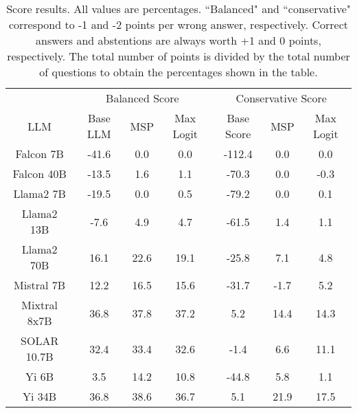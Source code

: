 \renewcommand\arraystretch{1.2}
\begin{table*}
\centering
\begin{tabular}{c|c|c|c|c|c|c}
& \multicolumn{3}{c|}{Balanced Score} & \multicolumn{3}{c}{Conservative Score} \\ 
LLM & Base LLM & MSP & Max Logit & Base Score & MSP & Max Logit\\ \hline
Falcon 7B & -41.6 & 0.0 & 0.0 & -112.4 & 0.0 & 0.0\\
Falcon 40B & -13.5 & 1.6 & 1.1 & -70.3 & 0.0 & -0.3\\
Llama2 7B & -19.5 & 0.0 & 0.5 & -79.2 & 0.0 & 0.1\\
Llama2 13B & -7.6 & 4.9 & 4.7 & -61.5 & 1.4 & 1.1\\
Llama2 70B & 16.1 & 22.6 & 19.1 & -25.8 & 7.1 & 4.8\\
Mistral 7B & 12.2 & 16.5 & 15.6 & -31.7 & -1.7 & 5.2\\
Mixtral 8x7B & 36.8 & 37.8 & 37.2 & 5.2 & 14.4 & 14.3\\
SOLAR 10.7B & 32.4 & 33.4 & 32.6 & -1.4 & 6.6 & 11.1\\
Yi 6B & 3.5 & 14.2 & 10.8 & -44.8 & 5.8 & 1.1\\
Yi 34B & 36.8 & 38.6 & 36.7 & 5.1 & 21.9 & 17.5\\
\hline
\end{tabular}
\caption{Score results. All values are percentages. ``Balanced" and ``conservative" correspond to -1 and -2 points per wrong answer, respectively. Correct answers and abstentions are always worth +1 and 0 points, respectively. The total number of points is divided by the total number of questions to obtain the percentages shown in the table.}
\label{tab:score}
\end{table*}
